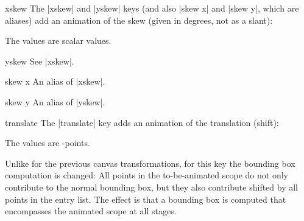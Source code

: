 \begin{animateattribute}{xskew}
    The |xskew| and |yskew| keys (and also |skew x| and |skew y|, which are
    aliases) add an animation of the skew (given in degrees, not as a slant):
\begin{codeexample}[animation list={0.5,1,1.5,2}]
\end{codeexample}
    The values are scalar values.
\end{animateattribute}

\begin{animateattribute}{yskew}
    See |xskew|.
\end{animateattribute}

\begin{animateattribute}{skew x}
    An alias of |xskew|.
\end{animateattribute}

\begin{animateattribute}{skew y}
    An alias of |yskew|.
\end{animateattribute}

\begin{animateattribute}{translate}
    The |translate| key adds an animation of the translation (shift):
\begin{codeexample}[animation list={0.5,1,1.5,2}]
\end{codeexample}
    The values are \pgfname-points.

    Unlike for the previous canvas transformations, for this key the bounding
    box computation is changed: All points in the to-be-animated scope do not
    only contribute to the normal bounding box, but they also contribute
    shifted by all points in the entry list. The effect is that a bounding box
    is computed that encompasses the animated scope at all stages.
\end{animateattribute}

